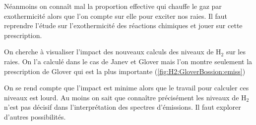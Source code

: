 Néanmoins on connaît mal la proportion effective qui chauffe le gaz par exothermicité alors que l'on compte sur elle pour exciter nos raies. Il faut reprendre l'étude sur l'exothermicité des réactions chimiques et jouer sur cette prescription. \newline 

On cherche à visualiser l'impact des nouveaux calculs des niveaux de $\mathrm{H}_2$ sur les raies. On l'a calculé dans le cas de Janev et Glover mais l'on montre seulement la prescription de Glover qui est la plus importante (\autoref{fig:H2:GloverBossion:emiss})

On se rend compte que l'impact est minime alors que le travail pour calculer ces niveaux est lourd. Au moins on sait que connaître précisément les niveaux de $\mathrm{H}_2$ n'est pas décisif dans l'interprétation des spectres d'émissions. Il faut explorer d'autres possibilités. 


